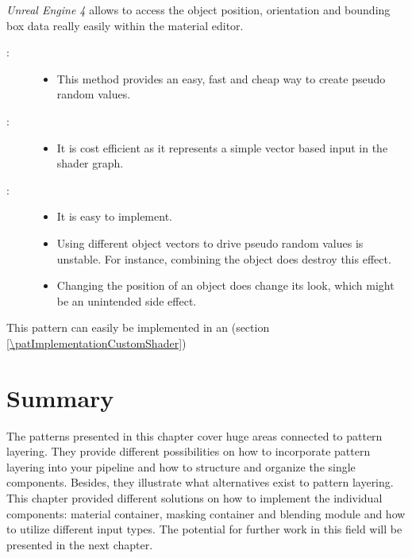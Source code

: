 \begin{description}
	\emph{Unreal Engine 4} allows to access the object position, orientation and bounding box data really easily within the material editor.
	\item[\patConsequences:]\hfill 
		\begin{description}
			\item[\visual:]\hfill
			\begin{itemize}\mynobreakpar
				\item This method provides an easy, fast and cheap way to create pseudo random values. 
			\end{itemize}
			\item[\performance:]\hfill
			\begin{itemize}\mynobreakpar
				\item It is cost efficient as it represents a simple vector based input in the shader graph. 
			\end{itemize}
			\item[\pipeline:]\hfill
			\begin{itemize}\mynobreakpar
				\item It is easy to implement. 
				\item Using different object vectors to drive pseudo random values is unstable. For instance, combining the object does destroy this effect.
				\item Changing the position of an object does change its look, which might be an unintended side effect. 
			\end{itemize}
		\end{description}
	\item[\patRelations:]%
	This pattern can easily be implemented in an \emph{\patImplementationCustomShader} (section \ref{\patImplementationCustomShader})
\end{description}


\section{Summary}

The patterns presented in this chapter cover huge areas connected to pattern layering. They provide different possibilities on how to incorporate pattern layering into your pipeline and how to structure and organize the single components. Besides, they illustrate what alternatives exist to pattern layering. This chapter provided different solutions on how to implement the individual components: material container, masking container and blending module and how to utilize different input types. The potential for further work in this field will be presented in the next chapter.


